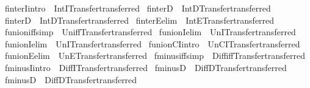 \begin{isabellebody}
\isamarkupfalse%
\ finterI{\isacharbrackleft}intro{\isacharbang}{\isacharbrackright}\ {\isacharequal}\ IntI{\isacharbrackleft}Transfer{\isachardot}transferred{\isacharbrackright}\isanewline
{}\isamarkupfalse%
\ finterD{}\ {\isacharequal}\ IntD{}{\isacharbrackleft}Transfer{\isachardot}transferred{\isacharbrackright}\isanewline
{}\isamarkupfalse%
\ finterD{}\ {\isacharequal}\ IntD{}{\isacharbrackleft}Transfer{\isachardot}transferred{\isacharbrackright}\isanewline
{}\isamarkupfalse%
\ finterE{\isacharbrackleft}elim{\isacharbang}{\isacharbrackright}\ {\isacharequal}\ IntE{\isacharbrackleft}Transfer{\isachardot}transferred{\isacharbrackright}\isanewline
{}\isamarkupfalse%
\ funion{\isacharunderscore}iff{\isacharbrackleft}simp{\isacharbrackright}\ {\isacharequal}\ Un{\isacharunderscore}iff{\isacharbrackleft}Transfer{\isachardot}transferred{\isacharbrackright}\isanewline
{}\isamarkupfalse%
\ funionI{}{\isacharbrackleft}elim{\isacharquery}{\isacharbrackright}\ {\isacharequal}\ UnI{}{\isacharbrackleft}Transfer{\isachardot}transferred{\isacharbrackright}\isanewline
{}\isamarkupfalse%
\ funionI{}{\isacharbrackleft}elim{\isacharquery}{\isacharbrackright}\ {\isacharequal}\ UnI{}{\isacharbrackleft}Transfer{\isachardot}transferred{\isacharbrackright}\isanewline
{}\isamarkupfalse%
\ funionCI{\isacharbrackleft}intro{\isacharbang}{\isacharbrackright}\ {\isacharequal}\ UnCI{\isacharbrackleft}Transfer{\isachardot}transferred{\isacharbrackright}\isanewline
{}\isamarkupfalse%
\ funionE{\isacharbrackleft}elim{\isacharbang}{\isacharbrackright}\ {\isacharequal}\ UnE{\isacharbrackleft}Transfer{\isachardot}transferred{\isacharbrackright}\isanewline
{}\isamarkupfalse%
\ fminus{\isacharunderscore}iff{\isacharbrackleft}simp{\isacharbrackright}\ {\isacharequal}\ Diff{\isacharunderscore}iff{\isacharbrackleft}Transfer{\isachardot}transferred{\isacharbrackright}\isanewline
{}\isamarkupfalse%
\ fminusI{\isacharbrackleft}intro{\isacharbang}{\isacharbrackright}\ {\isacharequal}\ DiffI{\isacharbrackleft}Transfer{\isachardot}transferred{\isacharbrackright}\isanewline
{}\isamarkupfalse%
\ fminusD{}\ {\isacharequal}\ DiffD{}{\isacharbrackleft}Transfer{\isachardot}transferred{\isacharbrackright}\isanewline
{}\isamarkupfalse%
\ fminusD{}\ {\isacharequal}\ DiffD{}{\isacharbrackleft}Transfer{\isachardot}transferred{\isacharbrackright}\isanewline

\end{isabellebody}
